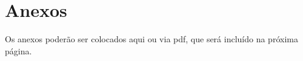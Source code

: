 \documentclass[12pt,oneside,a4paper]{report}
\begin{document}
\cleardoublepage
{}
{}
\printglossary[title=Glossário, style=altlist]







\chapter*{Anexos}

Os anexos poderão ser colocados aqui ou via pdf, que será incluído na próxima página. 


\end{document}
